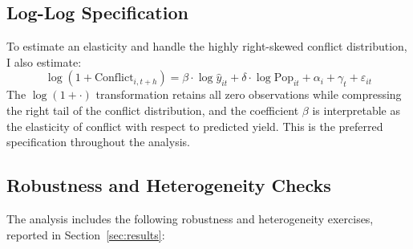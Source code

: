 \subsection{Log-Log Specification}

To estimate an elasticity and handle the highly right-skewed conflict distribution, I also estimate:
\begin{equation}
  \log(1 + \text{Conflict}_{i,t+h}) = \beta \cdot \log\hat{y}_{it} + \delta \cdot \log\text{Pop}_{it} + \alpha_i + \gamma_t + \varepsilon_{it}
  \label{eq:loglog}
\end{equation}
The $\log(1 + \cdot)$ transformation retains all zero observations while compressing the right tail of the conflict distribution, and the coefficient $\beta$ is interpretable as the elasticity of conflict with respect to predicted yield. This is the preferred specification throughout the analysis.

\subsection{Robustness and Heterogeneity Checks}

The analysis includes the following robustness and heterogeneity exercises, reported in Section~\ref{sec:results}:

